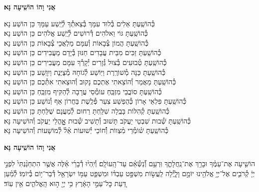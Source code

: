 \documentclass[twoside, openany, parskip=half, 11pt]{book}
\begin{document}

\label{ani vho}
\begin{large}
\textbf{אֲנִי וָהוֹ הוֹשִֽׁיעָה נָּא׃}
\end{large}



\begin{small}
כְּ֯הוֹשַֽׁעְתָּ אֵלִים בְּ֯לוּד עִמָּךְ בְּ֯צֵאתְ֯ךָ לְ֯יֵֽשַׁע עַמָּךְ \hfill כֵּן הוֹשַׁע נָא׃ \\
כְּ֯הוֹשַֽׁעְתָּ גּוֹי וֵאלֹהִים דְּ֯רוּשִׁים לְ֯יֵֽשַׁע אֱלֹהִים \hfill כֵּן הוֹשַׁע נָא׃ \\
כְּ֯הוֹשַֽׁעְתָּ הֲמוֹן צְ֯בָאוֹת וְ֯עִמָּם מַלְאֲכֵי צְ֯בָאוֹת \hfill כֵּן הוֹשַׁע נָא׃ \\
כְּ֯הוֹשַֽׁעְתָּ זַכִּים מִבֵּית עֲבָדִים חַנּוּן בְּ֯יָדָם מַעֲבִידִים \hfill כֵּן הוֹשַׁע נָא׃ \\
כְּ֯הוֹשַֽׁעְתָּ טְ֯בוּעִים בְּ֯צוּל גְּ֯זָרִים יְ֯קָרְ֯ךָ עִמָּם מַעֲבִירִים \hfill כֵּן הוֹשַׁע נָא׃ \\
כְּ֯הוֹשַֽׁעְתָּ כַּנָּה מְ֯שׁוֹרֶֽרֶת וַיּֽוֹשַׁע לְ֯גוֹחָהּ מְ֯צֻיֶּנֶת וַיִוָּֽשַׁע \hfill כֵּן הוֹשַׁע נָא׃ \\
כְּ֯הוֹשַֽׁעְתָּ מַאֲמַר וְ֯הוֹצֵאתִי אֶתְכֶם נָקוּב וְ֯הוּצֵאתִי אִתְּ֯כֶם \hfill כֵּן הוֹשַׁע נָא׃\\
כְּ֯הוֹשַֽׁעְתָּ סוֹבֲבֵי מִזְבֵּֽחַ עוֹמְ֯סֵי עֲרָבָה לְ֯הַקִּיף מִזְבֵּֽחַ \hfill כֵּן הוֹשַׁע נָא׃ \\
כְּ֯הוֹשַֽׁעְתָּ פִּלְאֵי אָרוֹן כְּ֯הֻפְשַׁע צִעֵר פְּ֯לֶֽשֶׁת בַּחֲרוֹן אַף וְ֯נוֹשַׁע \hfill כֵּן הוֹשַׁע נָא׃\\
כְּ֯הוֹשַֽׁעְתָּ קְ֯הִלּוֹת בָּבֶֽלָה שִׁלַּֽחְתָּ רַחוּם לְ֯מַעֲנָם שֻׁלַּחְתָּ \hfill כֵּן הוֹשַׁע נָא׃\\

כְּ֯הוֹשַֽׁעְתָּ שְׁ֯בוּת שִׁבְטֵי יַעֲקֹב תָּשׁוּב וְ֯תָשִׁיב שְׁ֯בוּת אׇׇׇׇהֳלֵי יַעֲקֹב \hfill וְ֯הוֹשִׁיעָה נָּא׃\\
כְּ֯הוֹשַֽׁעְתָּ שׁ֗וֹמְ֯רֵי מִ֗צְווֹת וְ֯֗חוֹכֵי יְ֯שׁוּעוֹת אֵ֗ל֗ לְ֯מוֹשָׁעוֹת \hfill וְ֯הוֹשִׁיעָה נָּא׃

\end{small}

\begin{large}
\textbf{אֲנִי וָהוֹ הוֹשִֽׁיעָה נָּא׃}
\end{large}

הוֹשִׁ֤יעָה אֶת־עַמֶּ֗ךָ וּבָרֵ֥ךְ אֶת־נַֽחֲלָתֶ֑ךָ וּֽרְעֵ֥ם וְ֯֝נַשְּׂ֯אֵ֗ם עַד־הָֽעוֹלָֽם׃ וְ֯יִֽהְי֨וּ דְ֯בָרַ֜י אֵ֗לֶּה אֲשֶׁ֤ר הִתְחַנַּ֨נְתִּי֙ לִפְנֵ֣י יְיָ֔ קְ֯רֹבִ֛ים אֶל־יְיָ֥ אֱלֹהֵ֖ינוּ יוֹמָ֣ם וָלָ֑יְ֯לָה לַֽעֲשׂ֣וֹת מִשְׁפַּ֣ט עַבְדּ֗וֹ וּמִשְׁפַּ֛ט עַמּ֥וֹ יִשְׂרָאֵ֖ל דְּ֯בַר־י֥וֹם בְּ֯יוֹמֽוֹ׃ לְ֯מַ֗עַן דַּ֚עַת כׇּל־עַמֵּ֣י הָאָ֔רֶץ כִּ֥י יְיָ֖ ה֣וּא הָֽאֱלֹהִ֑ים אֵ֖ין עֽוֹד׃
\end{document}

